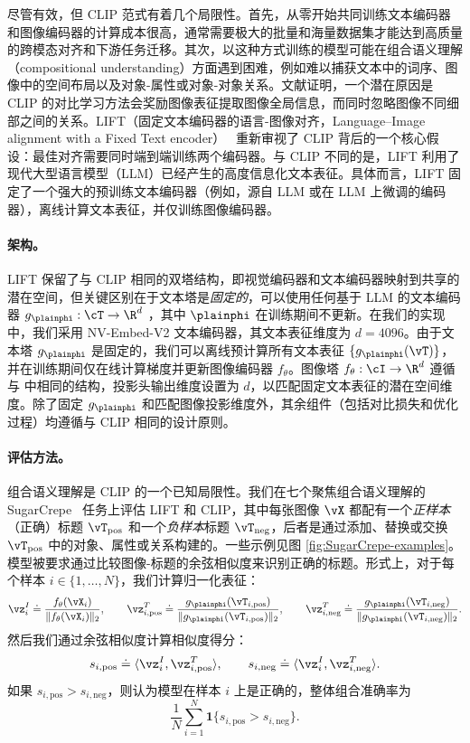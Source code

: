 \documentclass[../../book-main_zh.tex]{subfiles}
\begin{document}
尽管有效，但 CLIP 范式有着几个局限性。首先，从零开始共同训练文本编码器和图像编码器的计算成本很高，通常需要极大的批量和海量数据集才能达到高质量的跨模态对齐和下游任务迁移。其次，以这种方式训练的模型可能在组合语义理解（compositional understanding）方面遇到困难，例如难以捕获文本中的词序、图像中的空间布局以及对象-属性或对象-对象关系。文献证明，一个潜在原因是 CLIP 的对比学习方法会奖励图像表征提取图像全局信息，而同时忽略图像不同细部之间的关系。LIFT（固定文本编码器的语言-图像对齐，Language–Image alignment with a Fixed Text encoder）~\citep{yang2025languageimagealignmentfixedtext} 重新审视了 CLIP 背后的一个核心假设：最佳对齐需要同时端到端训练两个编码器。与 CLIP 不同的是，LIFT 利用了现代大型语言模型（LLM）已经产生的高度信息化文本表征。具体而言，LIFT 固定了一个强大的预训练文本编码器（例如，源自 LLM 或在 LLM 上微调的编码器），离线计算文本表征，并仅训练图像编码器。

\paragraph{架构。}
LIFT 保留了与 CLIP 相同的双塔结构，即视觉编码器和文本编码器映射到共享的潜在空间，但关键区别在于文本塔是\emph{固定的}，可以使用任何基于 LLM 的文本编码器 \(g_{\plainphi}:\cT\to\R^{d}\) ，其中 \(\plainphi\) 在训练期间不更新。在我们的实现中，我们采用 NV-Embed-V2 文本编码器，其文本表征维度为 \(d=4096\)。由于文本塔 \(g_{\plainphi}\) 是固定的，我们可以离线预计算所有文本表征 \(\{g_{\plainphi}(\vT)\}\)，并在训练期间仅在线计算梯度并更新图像编码器 \(f_{\theta}\)。图像塔 \(f_{\theta}:\cI\to\R^{d}\) 遵循与  中相同的结构，投影头输出维度设置为 \(d\)，以匹配固定文本表征的潜在空间维度。除了固定 \(g_{\plainphi}\) 和匹配图像投影维度外，其余组件（包括对比损失和优化过程）均遵循与 CLIP 相同的设计原则。

\paragraph{评估方法。}
组合语义理解是 CLIP 的一个已知局限性。我们在七个聚焦组合语义理解的 SugarCrepe~\citep{hsieh2023sugarcrepe} 任务上评估 LIFT 和 CLIP，其中每张图像 \(\vX\) 都配有一个\emph{正样本}（正确）标题 \(\vT_{\text{pos}}\) 和一个\emph{负样本}标题 \(\vT_{\text{neg}}\)，后者是通过添加、替换或交换 \(\vT_{\text{pos}}\) 中的对象、属性或关系构建的。一些示例见图 \ref{fig:SugarCrepe-examples}。模型被要求通过比较图像-标题的余弦相似度来识别正确的标题。形式上，对于每个样本 \(i\in\{1,\dots,N\}\)，我们计算归一化表征：
\[
\vz_i^{I} \doteq \frac{f_{\theta}(\vX_i)}{\|f_{\theta}(\vX_i)\|_2},\qquad
\vz_{i,\text{pos}}^{T} \doteq \frac{g_{\plainphi}(\vT_{i,\text{pos}})}{\|g_{\plainphi}(\vT_{i,\text{pos}})\|_2},\qquad
\vz_{i,\text{neg}}^{T} \doteq \frac{g_{\plainphi}(\vT_{i,\text{neg}})}{\|g_{\plainphi}(\vT_{i,\text{neg}})\|_2}.
\]
然后我们通过余弦相似度计算相似度得分：
\[
s_{i,\text{pos}} \doteq \langle \vz_i^{I}, \vz_{i,\text{pos}}^{T} \rangle,
\qquad
s_{i,\text{neg}} \doteq \langle \vz_i^{I}, \vz_{i,\text{neg}}^{T} \rangle.
\]
如果 \(s_{i,\text{pos}} > s_{i,\text{neg}}\)，则认为模型在样本 \(i\) 上是正确的，整体组合准确率为
\[
\frac{1}{N}\sum_{i=1}^{N}\boldsymbol{1}\{s_{i,\text{pos}} > s_{i,\text{neg}}\}.
\]
\end{document}
